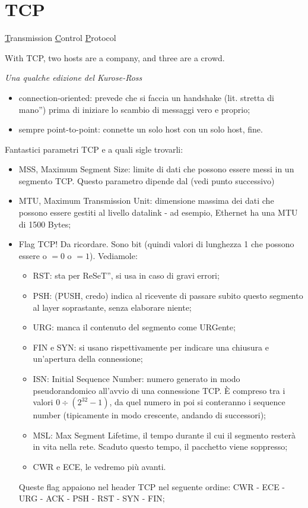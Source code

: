 \section*{TCP}
\underline{T}ransmission \underline{C}ontrol \underline{P}rotocol\\

\epigraph{With TCP, two hosts are a company, and three are a crowd.}{\textit{Una qualche edizione del Kurose-Ross}}

\begin{itemize}
    \item connection-oriented: prevede che si faccia un handshake (lit. \openapex stretta di mano'') prima di iniziare lo scambio di messaggi vero e proprio;
    \item sempre point-to-point: connette un solo host con un solo host, fine.
\end{itemize}

\noindent Fantastici parametri TCP e a quali sigle trovarli:
\begin{itemize}
    \item {}MSS, Maximum Segment Size: limite di dati che possono essere messi in un segmento TCP. Questo parametro dipende dal (vedi punto successivo)
    \item {}MTU, Maximum Transmission Unit: dimensione massima dei dati che possono essere gestiti al livello datalink - ad esempio, Ethernet ha una MTU di 1500 Bytes;
    \item {}Flag TCP! Da ricordare. Sono bit (quindi valori di lunghezza 1 che possono essere o $=0$ o $=1$). Vediamole:
    \begin{itemize}
        \item RST: sta per \openapex ReSeT'', si usa in caso di gravi errori;
        \item PSH: (PUSH, credo) indica al ricevente di passare subito questo segmento al layer soprastante, senza elaborare niente;
        \item URG: manca il contenuto del segmento come URGente;
        \item FIN e SYN: si usano rispettivamente per indicare una chiusura e un'apertura della connessione; 
        \item ISN: Initial Sequence Number: numero generato in modo pseudorandomico all'avvio di una connessione TCP. È compreso tra i valori $0\div(2^{32}-1)$, da quel numero in poi si conteranno i sequence number (tipicamente in modo crescente, andando di successori);
        \item MSL: Max Segment Lifetime, il tempo durante il cui il segmento resterà in vita nella rete. Scaduto questo tempo, il pacchetto viene soppresso;
        \item CWR e ECE, le vedremo più avanti.
    \end{itemize}
    Queste flag appaiono nel header TCP nel seguente ordine: CWR - ECE - URG - ACK - PSH - RST - SYN - FIN;
\end{itemize}

